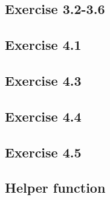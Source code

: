 \subsection{Exercise 3.2-3.6}\label{app:ex-3.2}





\subsection{Exercise 4.1}\label{app:ex-4.1}



\subsection{Exercise 4.3}\label{app:ex-4.3}




\subsection{Exercise 4.4}\label{app:ex-4.4}


\subsection{Exercise 4.5}\label{app:ex-4.5}


\subsection{Helper function}


\pagebreak



